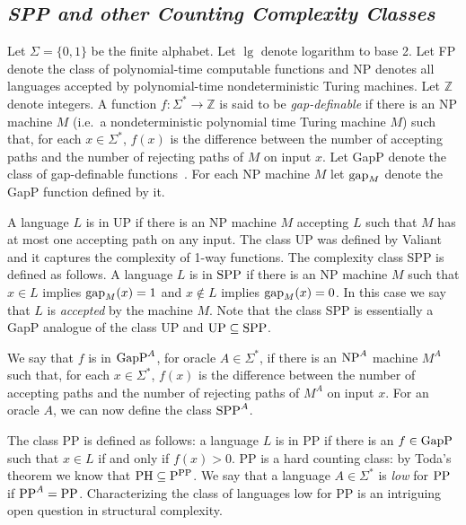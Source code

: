 \documentclass{article}
\newcommand{\gap}{{\rm gap}}
\newcommand{\NP}{{\rm NP}}
\newcommand{\p}{{\rm P}}
\newcommand{\UP}{{\rm UP}}
\newcommand{\GapP}{{\rm GapP}}
\newcommand{\PH}{{\rm PH}}
\newcommand{\PP}{{\rm PP}}
\newcommand{\SPP}{{\rm SPP}}
\theoremstyle{definition}\newtheorem{remark}[theorem]{Remark}
\begin{document}
\subsection{\it SPP and other Counting Complexity Classes}\label{defs}

Let $\Sigma=\{0,1\}$ be the finite alphabet. Let $\lg$ denote
logarithm to base 2. Let FP denote the class of polynomial-time
computable functions and NP denotes all languages accepted by
polynomial-time nondeterministic Turing machines. Let $\mathbb{Z}$
denote integers. A function $f:\Sigma^*\rightarrow\mathbb{Z}$ is said
to be {\em gap-definable} if there is an NP machine $M$ (i.e.\ a
nondeterministic polynomial time Turing machine $M$) such that, for
each $x\in\Sigma^*$, $f(x)$ is the difference between the number of
accepting paths and the number of rejecting paths of $M$ on input $x$.
Let GapP denote the class of gap-definable
functions~\cite{fenner91gapdefinable}. For each NP machine $M$ let
$\gap_M$ denote the GapP function defined by it.

A language $L$ is in UP if there is an NP machine $M$ accepting $L$
such that $M$ has at most one accepting path on any input. The class
UP was defined by Valiant and it captures the complexity of 1-way
functions. The complexity class SPP is defined as follows. A language
$L$ is in $\SPP$ if there is an NP machine $M$ such that $x\in L$
implies $\gap_M(x)=1$ and $x\not\in L$ implies $\gap_M(x)=0$. In this
case we say that $L$ is {\em accepted} by the machine $M$.  Note that
the class SPP is essentially a GapP analogue of the class UP and
$\UP\subseteq\SPP$.

We say that $f$ is in $\GapP^A$, for oracle $A\in\Sigma^*$, if there
is an $\NP^A$ machine $M^A$ such that, for each $x\in\Sigma^*$, $f(x)$
is the difference between the number of accepting paths and the number
of rejecting paths of $M^A$ on input $x$. For an oracle $A$, we can
now define the class $\SPP^A$.

The class PP is defined as follows: a language $L$ is in PP if there
is an $f\in\GapP$ such that $x\in L$ if and only if $f(x)>0$.  PP is a
hard counting class: by Toda's theorem we know that
$\PH\subseteq\p^{\PP}$.  We say that a language $A\in\Sigma^*$ is {\em
  low} for $\PP$ if $\PP^A=\PP$.  Characterizing the class of
languages low for PP is an intriguing open question in structural
complexity. 
\end{document}
